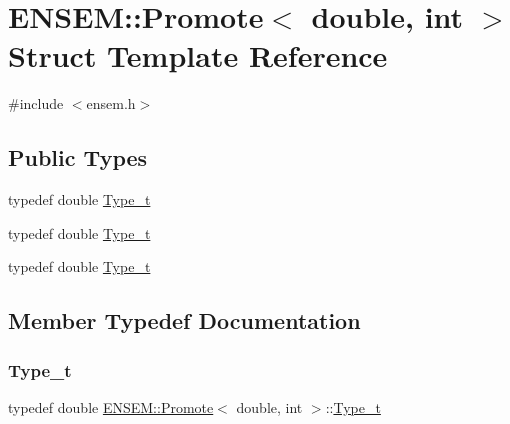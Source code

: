 \hypertarget{structENSEM_1_1Promote_3_01double_00_01int_01_4}{}\section{E\+N\+S\+EM\+:\+:Promote$<$ double, int $>$ Struct Template Reference}
\label{structENSEM_1_1Promote_3_01double_00_01int_01_4}


{\ttfamily \#include $<$ensem.\+h$>$}

\subsection*{Public Types}
\begin{DoxyCompactItemize}
\item 
typedef double \mbox{\hyperlink{structENSEM_1_1Promote_3_01double_00_01int_01_4_ae167376f3956c785560542ee33194136}{Type\+\_\+t}}
\item 
typedef double \mbox{\hyperlink{structENSEM_1_1Promote_3_01double_00_01int_01_4_ae167376f3956c785560542ee33194136}{Type\+\_\+t}}
\item 
typedef double \mbox{\hyperlink{structENSEM_1_1Promote_3_01double_00_01int_01_4_ae167376f3956c785560542ee33194136}{Type\+\_\+t}}
\end{DoxyCompactItemize}


\subsection{Member Typedef Documentation}
\mbox{\label{structENSEM_1_1Promote_3_01double_00_01int_01_4_ae167376f3956c785560542ee33194136}} 
\subsubsection{\texorpdfstring{Type\_t}{Type\_t}\hspace{0.1cm}{\footnotesize\ttfamily [1/3]}}
{\footnotesize\ttfamily typedef double \mbox{\hyperlink{structENSEM_1_1Promote}{E\+N\+S\+E\+M\+::\+Promote}}$<$ double, int $>$\+::\mbox{\hyperlink{structENSEM_1_1Promote_3_01double_00_01int_01_4_ae167376f3956c785560542ee33194136}{Type\+\_\+t}}}

